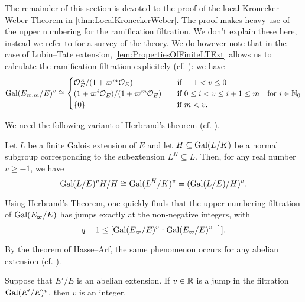 \documentclass[../main.tex]{subfiles}
\begin{document}
The remainder of this section is devoted to the proof of the local Kronecker--Weber 
Theorem in \cref{thm:LocalKroneckerWeber}.
The proof makes heavy use of the upper numbering for the ramification filtration.
We don't explain these here, instead we refer to \cite[Chapter
IV]{serre2013local} for a survey of the theory. We
do however note that in the case of Lubin--Tate extension, \cref{lem:PropertiesOfFiniteLTExt} allows us to calculate the 
ramification filtration explicitely (cf. \cite[Theorem
2]{gold1981local}): we have
\begin{equation}\label{eq:CalculationOfUpperRamificationFiltration}
  \operatorname{Gal}(E_{\varpi, m}/E)^v \cong \begin{cases}
    \mathcal{O}_E^\times/(1 + \varpi^m \mathcal{O}_E) \quad &\text{if } -1 < v \leq 0 \\
    (1 + \varpi^i \mathcal{O}_E)/(1+\varpi^m \mathcal{O}_E) \quad &\text{if } 0 \leq i < v \leq i+1
    \leq m 
    \quad \text{for } i \in \mathbb{N}_0 \\
    \{0\} \quad &\text{if } m < v.
  \end{cases}
\end{equation}

We need the following variant of Herbrand's theorem (cf. \cite[Chapter IV,
Proposition 14]{serre2013local}).
\begin{thm}\label{prop:HerbrandsThm}
  Let $L$ be a finite Galois extension of $E$ and let $H \subseteq \operatorname{Gal}(L/K)$ be a
  normal subgroup
  corresponding to the subextension $L^H \subseteq L$. Then, for any real number $v \geq -1$, 
  we have
  \begin{equation*}
    \operatorname{Gal}(L/E)^v H / H \cong \operatorname{Gal}(L^H/K)^v = (\operatorname{Gal}(L/E)/H)^v.
  \end{equation*}
\end{thm}

Using Herbrand's Theorem, one quickly finds that the upper numbering filtration of 
$\operatorname{Gal}(E_\varpi/E)$ has jumps exactly at the non-negative integers, with
\begin{equation*}
  q-1 \leq [\operatorname{Gal}(E_\varpi/E)^{v} : \operatorname{Gal}(E_\varpi/E)^{v+1}].
\end{equation*}

By the theorem of Hasse--Arf, the same phenomenon occurs for any abelian extension 
(cf. \cite{arf1940untersuchungen}).
\begin{thm}\label{thm:Hasse--Arf}
  Suppose that $E'/E$ is an abelian extension. If $v \in \mathbb{R}$ is a jump in the 
  filtration $\operatorname{Gal}(E'/E)^v$, then $v$ is an integer.
\end{thm}
\end{document}

